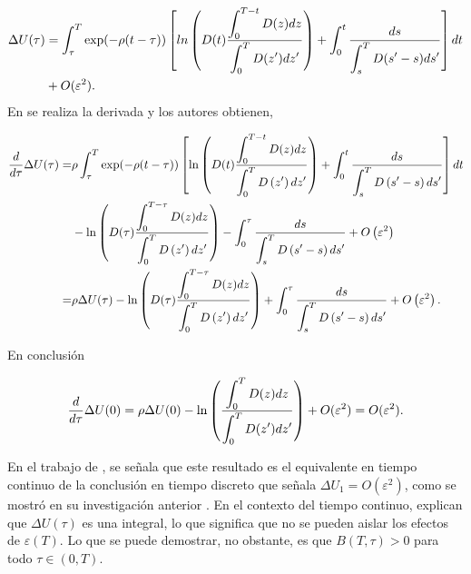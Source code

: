 \begin{align*}
\Delta U(\tau) &= \displaystyle \int_{\tau}^T \exp (-\rho(t-\tau)) \left[ln \left(D(t) \dfrac{\displaystyle \int_0^{T-t}D(z)dz}{\displaystyle \int_0^{T}D(z')dz'} \right) + \displaystyle \int_0^t \dfrac{ds}{\displaystyle \int_s^T D(s'-s)ds'} \right] dt \\
&+ O(\varepsilon^2).
\end{align*}
%
\noindent En \parencite{feigenbaum2021deviation} se realiza la derivada y los autores obtienen,

\begin{align*}
\dfrac{d}{d \tau} \Delta U(\tau)= & \rho \displaystyle \int_\tau^T \exp (-\rho(t-\tau))\left[\ln \left(D(t) \dfrac{\displaystyle \int_0^{T-t} D(z) d z}{\displaystyle \int_0^T D\left(z^{\prime}\right) d z^{\prime}}\right)+\displaystyle \int_0^t \dfrac{d s}{\displaystyle \int_s^T D\left(s^{\prime}-s\right) d s^{\prime}}\right] d t \\
& -\ln \left(D(\tau) \dfrac{\displaystyle \int_0^{T-\tau} D(z) d z}{\displaystyle \int_0^T D\left(z^{\prime}\right) d z^{\prime}}\right)-\displaystyle \int_0^\tau \dfrac{d s}{\displaystyle \int_s^T D\left(s^{\prime}-s\right) d s^{\prime}}+O\left(\varepsilon^2\right) \\
= & \rho \Delta U(\tau)-\ln \left(D(\tau) \dfrac{\displaystyle \int_0^{T-\tau} D(z) d z}{\displaystyle \int_0^T D\left(z^{\prime}\right) d z^{\prime}}\right)+\displaystyle \int_0^\tau \dfrac{d s}{\displaystyle \int_s^T D\left(s^{\prime}-s\right) d s^{\prime}}+O\left(\varepsilon^2\right).
\end{align*}

\noindent En conclusión

\begin{equation}
\label{eq 64}
    \dfrac{d}{d\tau} \Delta U(0) = \rho \Delta U(0) - \ln \left( \dfrac{\displaystyle \int_0^T D(z) dz}{\displaystyle \int_0^T D(z') dz'} \right) + O(\varepsilon^2)=O(\varepsilon^2).
\end{equation}

\noindent 
En el trabajo de \parencite{feigenbaum2021deviation}, se señala que este resultado es el equivalente en tiempo continuo de la conclusión en tiempo discreto que señala $\Delta U_1 = O(\varepsilon^2)$, como se mostró en su investigación anterior \parencite{Feigenbaum21}.
En el contexto del tiempo continuo, explican que $\Delta U(\tau)$ es una integral, lo que significa que no se pueden aislar los efectos de $\varepsilon(T)$. Lo que se puede demostrar, no obstante, es que $B(T, \tau) > 0$ para todo $\tau \in (0, T)$.

